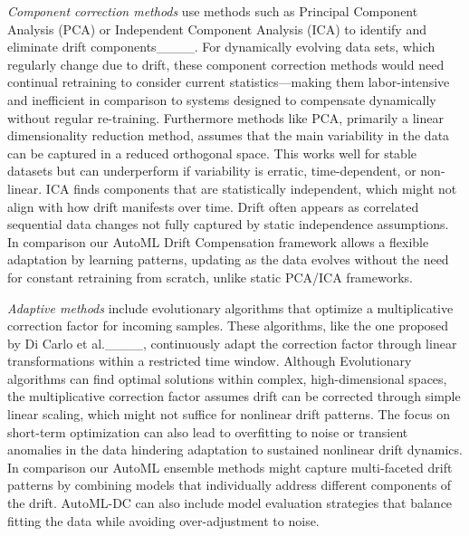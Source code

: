 \emph{Component correction methods} use methods such as Principal Component Analysis (PCA) or Independent Component Analysis (ICA) to identify and eliminate drift components____. For dynamically evolving data sets, which regularly change due to drift, these component correction methods would need continual retraining to consider current statistics—making them labor-intensive and inefficient in comparison to systems designed to compensate dynamically without regular re-training. Furthermore methods like PCA, primarily a linear dimensionality reduction method, assumes that the main variability in the data can be captured in a reduced orthogonal space. This works well for stable datasets but can underperform if variability is erratic, time-dependent, or non-linear. ICA finds components that are statistically independent, which might not align with how drift manifests over time. Drift often appears as correlated sequential data changes not fully captured by static independence assumptions. In comparison our AutoML Drift Compensation framework allows a flexible adaptation by learning patterns, updating as the data evolves without the need for constant retraining from scratch, unlike static PCA/ICA frameworks.


\emph{Adaptive methods} include evolutionary algorithms that optimize a multiplicative correction factor for incoming samples. These algorithms, like the one proposed by Di Carlo et al.____, continuously adapt the correction factor through linear transformations within a restricted time window. Although Evolutionary algorithms can find optimal solutions within complex, high-dimensional spaces, the multiplicative correction factor assumes drift can be corrected through simple linear scaling, which might not suffice for nonlinear drift patterns. The focus on short-term optimization can also lead to overfitting to noise or transient anomalies in the data hindering adaptation to sustained nonlinear drift dynamics. In comparison our AutoML ensemble methods might capture multi-faceted drift patterns by combining models that individually address different components of the drift. AutoML-DC can also include model evaluation strategies that balance fitting the data while avoiding over-adjustment to noise.

